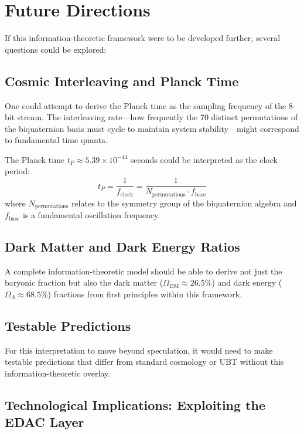 \section{Future Directions}

If this information-theoretic framework were to be developed further, several questions could be explored:

\subsection{Cosmic Interleaving and Planck Time}

One could attempt to derive the Planck time as the sampling frequency of the 8-bit stream. The interleaving rate—how frequently the 70 distinct permutations of the biquaternion basis must cycle to maintain system stability—might correspond to fundamental time quanta.

The Planck time $t_P \approx 5.39 \times 10^{-44}$ seconds could be interpreted as the clock period:
\begin{equation}
t_P = \frac{1}{f_{\text{clock}}} = \frac{1}{N_{\text{permutations}} \cdot f_{\text{base}}}
\end{equation}
where $N_{\text{permutations}}$ relates to the symmetry group of the biquaternion algebra and $f_{\text{base}}$ is a fundamental oscillation frequency.

\subsection{Dark Matter and Dark Energy Ratios}

A complete information-theoretic model should be able to derive not just the baryonic fraction but also the dark matter ($\Omega_{\text{DM}} \approx 26.5\%$) and dark energy ($\Omega_{\Lambda} \approx 68.5\%$) fractions from first principles within this framework.

\subsection{Testable Predictions}

For this interpretation to move beyond speculation, it would need to make testable predictions that differ from standard cosmology or UBT without this information-theoretic overlay.

\subsection{Technological Implications: Exploiting the EDAC Layer}


